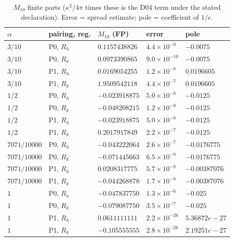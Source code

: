 \documentclass[11pt,a4paper]{article}
\theoremstyle{plain}
\theoremstyle{definition}
\theoremstyle{remark}
\numberwithin{equation}{section}
\begin{document}
\begin{center}
\small
\begin{longtable}{@{}lllll@{}}
\caption{\(M_{10}\) finite parts (\(\kappa^2/4\pi\) times these is the D04 term under the stated declaration). Error = spread estimate; pole = coefficient of \(1/\epsilon\).}\label{tab:v11M10}\\
\toprule
\(\alpha\) & pairing, reg. & \(M_{10}\) (FP) & error & pole\\
\midrule
\(3/10\) & P0, \(R_h\) & \(0.1157438826\) & \(4.4\times10^{-9}\) & \(-0.0075\)\\
\(3/10\) & P0, \(R_k\) & \(0.0973390865\) & \(9.0\times10^{-10}\) & \(-0.0075\)\\
\(3/10\) & P1, \(R_h\) & \(0.0169054255\) & \(1.2\times10^{-8}\) & \(0.0196605\)\\
\(3/10\) & P1, \(R_k\) & \(1.9509542118\) & \(4.4\times10^{-7}\) & \(0.0196605\)\\
\(1/2\) & P0, \(R_h\) & \(-0.023918875\) & \(5.0\times10^{-8}\) & \(-0.0125\)\\
\(1/2\) & P0, \(R_k\) & \(-0.048208215\) & \(1.2\times10^{-8}\) & \(-0.0125\)\\
\(1/2\) & P1, \(R_h\) & \(-0.023918875\) & \(5.0\times10^{-8}\) & \(-0.0125\)\\
\(1/2\) & P1, \(R_k\) & \(0.2017917849\) & \(2.2\times10^{-7}\) & \(-0.0125\)\\
\(7071/10000\) & P0, \(R_h\) & \(-0.043222064\) & \(2.6\times10^{-7}\) & \(-0.0176775\)\\
\(7071/10000\) & P0, \(R_k\) & \(-0.071445663\) & \(6.5\times10^{-8}\) & \(-0.0176775\)\\
\(7071/10000\) & P1, \(R_h\) & \(0.0208317775\) & \(5.7\times10^{-8}\) & \(-0.00387076\)\\
\(7071/10000\) & P1, \(R_k\) & \(-0.044268878\) & \(1.7\times10^{-8}\) & \(-0.00387076\)\\
\(1\) & P0, \(R_h\) & \(-0.047837750\) & \(1.3\times10^{-6}\) & \(-0.025\)\\
\(1\) & P0, \(R_k\) & \(-0.079087750\) & \(3.5\times10^{-7}\) & \(-0.025\)\\
\(1\) & P1, \(R_h\) & \(0.0611111111\) & \(2.2\times10^{-26}\) & \(5.36872e-27\)\\
\(1\) & P1, \(R_k\) & \(-0.105555555\) & \(2.8\times10^{-26}\) & \(2.19251e-27\)\\
\bottomrule
\end{longtable}
\end{center}
\end{document}
